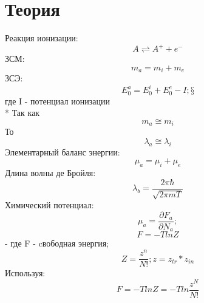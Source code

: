 \documentclass[letterpaper,12pt]{article} %
\begin{document}
\section{Теория}
Реакция ионизации:
\begin{equation} \label{eq:aperp} %
A\rightleftharpoons A^{+}+e^{-}
\end{equation}
ЗСМ:
\begin{equation} \label{eq:aperp} %
m_{a}=m_{i}+m_{e}
\end{equation}
ЗСЭ:
\begin{equation} \label{eq:aperp} %
E_{0}^{a}=E_{0}^{i}+E_{0}^{e}-I ;§
\end{equation}
где I - потенциал ионизации
\\*
Так как
\begin{equation} \label{eq:aperp} %
m_{a}\cong m_{i}
\end{equation}
То
\begin{equation} \label{eq:aperp} %
\lambda_{a}\cong \lambda_{i}
\end{equation} 
Элементарный баланс энергии:
\begin{equation} \label{eq:aperp} %
\mu_{a}=\mu_{i}+\mu_{e}
\end{equation}
Длина волны де Бройля:
\begin{equation} \label{eq:aperp} %
\lambda_{b}= \frac{2\pi\hbar}{\sqrt{2\pi m T}}
\end{equation}
Химический потенциал:
\begin{equation} \label{eq:aperp} %
\mu_{a}=\frac{\partial F_{a}}{\partial N_{a}} ;
\end{equation}
\begin{equation} \label{eq:aperp} %
F= -Tln{Z} 
\end{equation}
- где F - cвободная энергия; 
\begin{equation} \label{eq:aperp} %
Z = \frac{z^n}{N!}; z = z_{tr}*z_{in} 
\end{equation}
Используя:
\begin{equation} \label{eq:aperp} %
F = -Tln{Z}=-Tln{\frac{z^N}{N!}} 
\end{equation}
\end{document}
